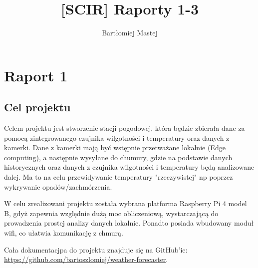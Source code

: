 \documentclass{article}
\begin{document}
%
\title{[SCIR] Raporty 1-3}
%

\author{Bartłomiej Mastej}
%
%
%
\maketitle              %
%
%
%
%
\section{Raport 1}
\subsection{Cel projektu}
Celem projektu jest stworzenie stacji pogodowej, która będzie zbierała dane za pomocą zintegrowanego czujnika wilgotności i temperatury oraz danych z kamerki.
Dane z kamerki mają być wstępnie przetważane lokalnie (Edge computing), a następnie wysyłane do chumury, gdzie na podstawie danych historycznych oraz danych z czujnika wilgotności i temperatury będą analizowane dalej. Ma to na celu przewidywanie temperatury "rzeczywistej" np poprzez wykrywanie opadów/zachmórzenia.

W celu zrealizowani projektu została wybrana platforma Raspberry Pi 4 model B, gdyż zapewnia względnie dużą moc obliczeniową, wystarczającą do prowadzenia prostej analizy danych lokalnie. Ponadto posiada wbudowany moduł wifi, co ułatwia komunikację z chmurą.

Cała dokumentacjpa do projektu znajduje się na GitHub'ie: \url{https://github.com/bartoszlomiej/weather-forecaster}.
\end{document}
